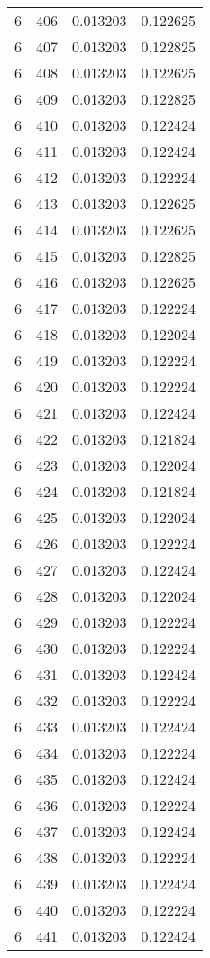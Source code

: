\begin{longtable}{rrrr}
6 & 406 & 0.013203 & 0.122625 \\
6 & 407 & 0.013203 & 0.122825 \\
6 & 408 & 0.013203 & 0.122625 \\
6 & 409 & 0.013203 & 0.122825 \\
6 & 410 & 0.013203 & 0.122424 \\
6 & 411 & 0.013203 & 0.122424 \\
6 & 412 & 0.013203 & 0.122224 \\
6 & 413 & 0.013203 & 0.122625 \\
6 & 414 & 0.013203 & 0.122625 \\
6 & 415 & 0.013203 & 0.122825 \\
6 & 416 & 0.013203 & 0.122625 \\
6 & 417 & 0.013203 & 0.122224 \\
6 & 418 & 0.013203 & 0.122024 \\
6 & 419 & 0.013203 & 0.122224 \\
6 & 420 & 0.013203 & 0.122224 \\
6 & 421 & 0.013203 & 0.122424 \\
6 & 422 & 0.013203 & 0.121824 \\
6 & 423 & 0.013203 & 0.122024 \\
6 & 424 & 0.013203 & 0.121824 \\
6 & 425 & 0.013203 & 0.122024 \\
6 & 426 & 0.013203 & 0.122224 \\
6 & 427 & 0.013203 & 0.122424 \\
6 & 428 & 0.013203 & 0.122024 \\
6 & 429 & 0.013203 & 0.122224 \\
6 & 430 & 0.013203 & 0.122224 \\
6 & 431 & 0.013203 & 0.122424 \\
6 & 432 & 0.013203 & 0.122224 \\
6 & 433 & 0.013203 & 0.122424 \\
6 & 434 & 0.013203 & 0.122224 \\
6 & 435 & 0.013203 & 0.122424 \\
6 & 436 & 0.013203 & 0.122224 \\
6 & 437 & 0.013203 & 0.122424 \\
6 & 438 & 0.013203 & 0.122224 \\
6 & 439 & 0.013203 & 0.122424 \\
6 & 440 & 0.013203 & 0.122224 \\
6 & 441 & 0.013203 & 0.122424 \\

\end{longtable}
